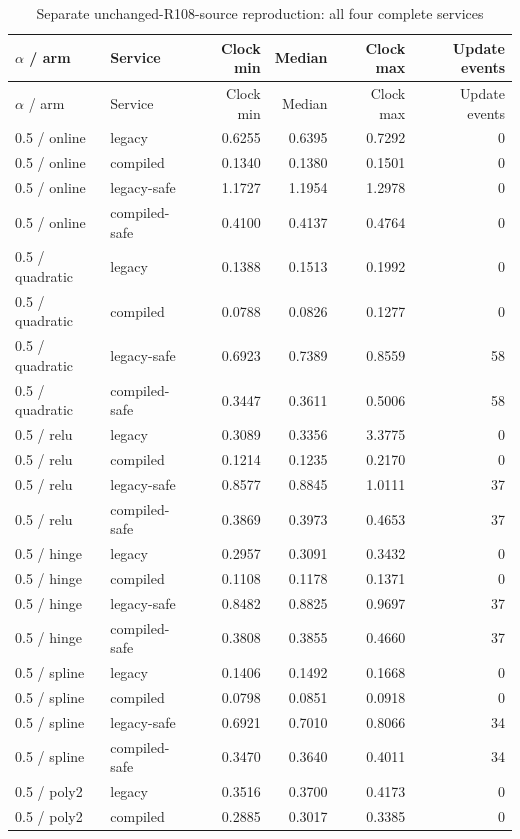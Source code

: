 \begin{longtable}{@{}llrrrr@{}}\caption{Separate unchanged-R108-source reproduction: all four complete services}\\
\toprule $\alpha$ / arm & Service & Clock min & Median & Clock max & Update events\\\midrule\endfirsthead
\toprule $\alpha$ / arm & Service & Clock min & Median & Clock max & Update events\\\midrule\endhead
0.5 / online & legacy & 0.6255 & 0.6395 & 0.7292 & 0\\
0.5 / online & compiled & 0.1340 & 0.1380 & 0.1501 & 0\\
0.5 / online & legacy-safe & 1.1727 & 1.1954 & 1.2978 & 0\\
0.5 / online & compiled-safe & 0.4100 & 0.4137 & 0.4764 & 0\\
0.5 / quadratic & legacy & 0.1388 & 0.1513 & 0.1992 & 0\\
0.5 / quadratic & compiled & 0.0788 & 0.0826 & 0.1277 & 0\\
0.5 / quadratic & legacy-safe & 0.6923 & 0.7389 & 0.8559 & 58\\
0.5 / quadratic & compiled-safe & 0.3447 & 0.3611 & 0.5006 & 58\\
0.5 / relu & legacy & 0.3089 & 0.3356 & 3.3775 & 0\\
0.5 / relu & compiled & 0.1214 & 0.1235 & 0.2170 & 0\\
0.5 / relu & legacy-safe & 0.8577 & 0.8845 & 1.0111 & 37\\
0.5 / relu & compiled-safe & 0.3869 & 0.3973 & 0.4653 & 37\\
0.5 / hinge & legacy & 0.2957 & 0.3091 & 0.3432 & 0\\
0.5 / hinge & compiled & 0.1108 & 0.1178 & 0.1371 & 0\\
0.5 / hinge & legacy-safe & 0.8482 & 0.8825 & 0.9697 & 37\\
0.5 / hinge & compiled-safe & 0.3808 & 0.3855 & 0.4660 & 37\\
0.5 / spline & legacy & 0.1406 & 0.1492 & 0.1668 & 0\\
0.5 / spline & compiled & 0.0798 & 0.0851 & 0.0918 & 0\\
0.5 / spline & legacy-safe & 0.6921 & 0.7010 & 0.8066 & 34\\
0.5 / spline & compiled-safe & 0.3470 & 0.3640 & 0.4011 & 34\\
0.5 / poly2 & legacy & 0.3516 & 0.3700 & 0.4173 & 0\\
0.5 / poly2 & compiled & 0.2885 & 0.3017 & 0.3385 & 0\\

\end{longtable}
